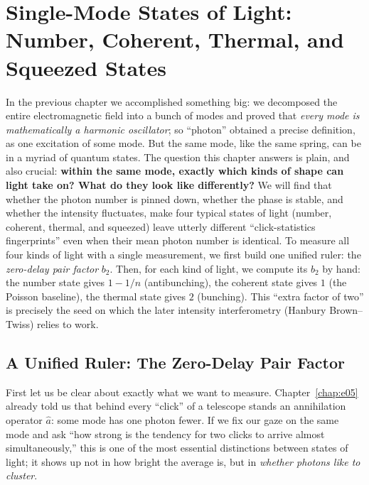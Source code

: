 \chapter{Single-Mode States of Light: Number, Coherent, Thermal, and Squeezed States}
\label{chap:e06}

\begin{chapteropening}
In the previous chapter we accomplished something big: we decomposed the entire electromagnetic field into a bunch of modes and proved that \emph{every mode is mathematically a harmonic oscillator}; so ``photon'' obtained a precise definition, as one excitation of some mode. But the same mode, like the same spring, can be in a myriad of quantum states. The question this chapter answers is plain, and also crucial: \textbf{within the same mode, exactly which kinds of shape can light take on? What do they look like differently?} We will find that whether the photon number is pinned down, whether the phase is stable, and whether the intensity fluctuates, make four typical states of light (number, coherent, thermal, and squeezed) leave utterly different ``click-statistics fingerprints'' even when their mean photon number is identical. To measure all four kinds of light with a single measurement, we first build one unified ruler: the \emph{zero-delay pair factor} \(b_2\). Then, for each kind of light, we compute its \(b_2\) by hand: the number state gives \(1-1/n\) (antibunching), the coherent state gives \(1\) (the Poisson baseline), the thermal state gives \(2\) (bunching). This ``extra factor of two'' is precisely the seed on which the later intensity interferometry (Hanbury Brown--Twiss) relies to work.
\end{chapteropening}

\section{A Unified Ruler: The Zero-Delay Pair Factor}
\label{sec:e06-b2}

First let us be clear about exactly what we want to measure. Chapter~\ref{chap:e05} already told us that behind every ``click'' of a telescope stands an annihilation operator \(\hat a\): some mode has one photon fewer. If we fix our gaze on the same mode and ask ``how strong is the tendency for two clicks to arrive almost simultaneously,'' this is one of the most essential distinctions between states of light; it shows up not in how bright the average is, but in \emph{whether photons like to cluster}.

